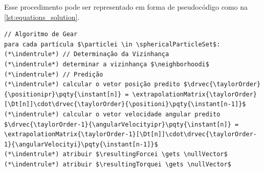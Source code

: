 Esse procedimento pode ser representado em forma de pseudocódigo como na \cref{lst:equations_solution}.

\begin{lstlisting}[float, floatplacement=h, language=pseudocode, label=lst:equations_solution, caption=Pseudocódigo para a solução das equações de movimento de partículas esféricas por meio do algoritmo de Gear.]
// Algoritmo de Gear
para cada partícula $\particlei \in \sphericalParticleSet$:
(*\indentrule*)	// Determinação da Vizinhança
(*\indentrule*)	determinar a vizinhança $\neighborhoodi$
(*\indentrule*)	// Predição
(*\indentrule*)	calcular o vetor posição predito $\drvec{\taylorOrder}{\positionipr}\pqty{\instant[n]} = \extrapolationMatrix{\taylorOrder}[\Dt[n]]\cdot\drvec{\taylorOrder}{\positioni}\pqty{\instant[n-1]}$
(*\indentrule*)	calcular o vetor velocidade angular predito $\drvec{\taylorOrder-1}{\angularVelocityipr}\pqty{\instant[n]} = \extrapolationMatrix{\taylorOrder-1}[\Dt[n]]\cdot\drvec{\taylorOrder-1}{\angularVelocityi}\pqty{\instant[n-1]}$
(*\indentrule*)	atribuir $\resultingForcei \gets \nullVector$
(*\indentrule*)	atribuir $\resultingTorquei \gets \nullVector$


\end{lstlisting}
